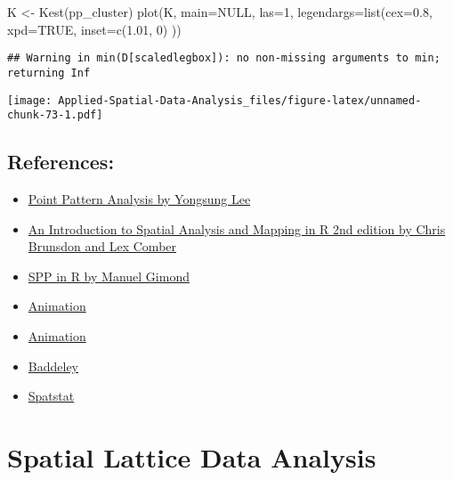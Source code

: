 \documentclass[
]{book}
\newenvironment{Shaded}{\begin{snugshade}}{\end{snugshade}}
\newcommand{\AttributeTok}[1]{\textcolor[rgb]{0.77,0.63,0.00}{#1}}
\newcommand{\ConstantTok}[1]{\textcolor[rgb]{0.00,0.00,0.00}{#1}}
\newcommand{\DecValTok}[1]{\textcolor[rgb]{0.00,0.00,0.81}{#1}}
\newcommand{\FloatTok}[1]{\textcolor[rgb]{0.00,0.00,0.81}{#1}}
\newcommand{\FunctionTok}[1]{\textcolor[rgb]{0.00,0.00,0.00}{#1}}
\newcommand{\NormalTok}[1]{#1}
\newcommand{\OtherTok}[1]{\textcolor[rgb]{0.56,0.35,0.01}{#1}}
\begin{document}
\begin{Shaded}
\begin{Highlighting}[]
\NormalTok{K }\OtherTok{\textless{}{-}} \FunctionTok{Kest}\NormalTok{(pp\_cluster)}
\FunctionTok{plot}\NormalTok{(K, }\AttributeTok{main=}\ConstantTok{NULL}\NormalTok{, }\AttributeTok{las=}\DecValTok{1}\NormalTok{, }\AttributeTok{legendargs=}\FunctionTok{list}\NormalTok{(}\AttributeTok{cex=}\FloatTok{0.8}\NormalTok{, }\AttributeTok{xpd=}\ConstantTok{TRUE}\NormalTok{, }\AttributeTok{inset=}\FunctionTok{c}\NormalTok{(}\FloatTok{1.01}\NormalTok{, }\DecValTok{0}\NormalTok{) ))}
\end{Highlighting}
\end{Shaded}

\begin{verbatim}
## Warning in min(D[scaledlegbox]): no non-missing arguments to min; returning Inf
\end{verbatim}

\texttt{[image: Applied-Spatial-Data-Analysis\_files/figure-latex/unnamed-chunk-73-1.pdf]}

\hypertarget{references}{%
\section{References:}\label{references}}

\begin{itemize}
\item
  \href{https://rpubs.com/spring19cp6521/Week11_Wednesday1}{Point Pattern Analysis by Yongsung Lee}
\item
  \href{https://bookdown.org/lexcomber/brunsdoncomber2e/Ch6.html}{An Introduction to Spatial Analysis and Mapping in R 2nd edition by Chris Brunsdon and Lex Comber}
\item
  \href{https://mgimond.github.io/Spatial/point-pattern-analysis-in-r.html}{SPP in R by Manuel Gimond}
\item
  \href{https://yihui.org/animation/example/animation-package/}{Animation}
\item
  \href{https://skirmer.github.io/animation_prez.html\#1}{Animation}
\item
  \href{https://research.csiro.au/software/wp-content/uploads/sites/6/2015/02/Rspatialcourse_CMIS_PDF-Standard.pdf}{Baddeley}
\item
  \href{http://book.spatstat.org/sample-chapters/chapter07.pdf}{Spatstat}
\end{itemize}

\hypertarget{spatial-lattice-data-analysis}{%
\chapter{Spatial Lattice Data Analysis}\label{spatial-lattice-data-analysis}}
\end{document}
